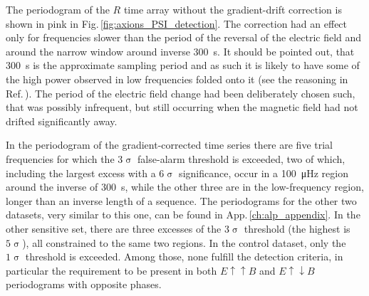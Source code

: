 The periodogram of the $R$ time array without the gradient-drift correction is shown in pink in Fig.\,\ref{fig:axions_PSI_detection}. The correction had an effect only for frequencies slower than the period of the reversal of the electric field and around the narrow window around inverse \SI{300}{\second}. It should be pointed out, that \SI{300}{\second} is the approximate sampling period and as such it is likely to have some of the high power observed in low frequencies folded onto it (see the reasoning in Ref.\,\cite{Shannon1949}). The period of the electric field change had been deliberately chosen such, that was possibly infrequent, but still occurring when the magnetic field had not drifted significantly away.

In the periodogram of the gradient-corrected time series there are five
trial frequencies for which the $3\upsigma$ false-alarm threshold is exceeded,
two of which, including the largest excess with a $6\upsigma$ significance, occur in a \SI{100}{\micro\hertz} region around the inverse of \SI{300}{\second}, while the other three are in the low-frequency region, longer than an inverse length of a sequence.
 The periodograms for the other two datasets, very similar to this one, can be found in App.\,\ref{ch:alp_appendix}.
In the other sensitive set, there are three excesses of the $3\upsigma$ threshold (the highest is $5\upsigma$), all constrained to the same two regions. In the control dataset, only the $1\upsigma$ threshold is exceeded. Among those, none fulfill the detection criteria, in particular the requirement to be present in both $E \uparrow \uparrow B$ and $E \uparrow \downarrow B$ periodograms with opposite phases.


